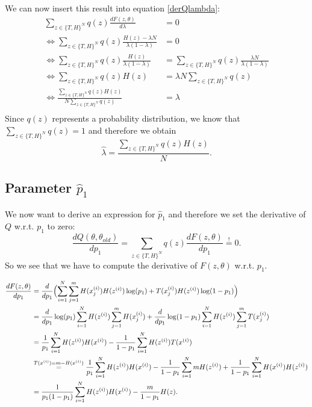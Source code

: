 \documentclass[10pt,a4paper]{article}
\begin{document}
We can now insert this result into equation \ref{derQlambda}:
\begin{align*}
\sum_{z\in \{T,H\}^N} q(z) \frac{dF(z,\theta)}{d\lambda} &=0\\
\Leftrightarrow \sum_{z\in \{T,H\}^N} q(z) \frac{H(z)-\lambda N}{\lambda(1-\lambda)} &=0\\
\Leftrightarrow \sum_{z\in \{T,H\}^N} q(z) \frac{H(z)}{\lambda(1-\lambda)} &= \sum_{z\in \{T,H\}^N} q(z) \frac{\lambda N}{\lambda(1-\lambda)}\\
\Leftrightarrow \sum_{z\in \{T,H\}^N} q(z) H(z) &= \lambda N \sum_{z\in \{T,H\}^N} q(z) \\
\Leftrightarrow \frac{\sum_{z\in \{T,H\}^N} q(z) H(z)}{N \sum_{z\in \{T,H\}^N} q(z)} &= \lambda\\
\end{align*}
Since $q(z)$ represents a probability distribution, we know that $\sum_{z\in \{T,H\}^N} q(z)=1$ and therefore we obtain
\begin{equation*}
\hat \lambda = \frac{\sum_{z\in \{T,H\}^N} q(z) H(z)}{N}.
\end{equation*}

\subsection*{Parameter $\hat p_1$}

We now want to derive an expression for $\hat p_1$ and therefore we set the derivative of $Q$ w.r.t. $p_1$ to zero:
\begin{equation}\label{derQp1}
\frac{dQ(\theta,\theta_{old})}{d p_1}=\sum_{z\in \{T,H\}^N} q(z) \frac{dF(z,\theta)}{d p_1} \stackrel{!}{=}0.
\end{equation}
So we see that we have to compute the derivative of $F(z,\theta)$ w.r.t. $p_1$.

\begin{align*}
\frac{dF(z,\theta)}{d p_1} &= \frac{d}{d p_1} \Bigl ( \sum_{i=1}^N \sum_{j=1}^m  H(x_j^{(i)}) H(z^{(i)}) \log(p_1) + T(x_j^{(i)}) H(z^{(i)})\log(1-p_1) \Bigr )\\
&= \frac{d}{d p_1} \log(p_1) \sum_{i=1}^N  H(z^{(i)})\sum_{j=1}^m  H(x_j^{(i)})  + \frac{d}{d p_1} \log(1-p_1) \sum_{i=1}^N H(z^{(i)}) \sum_{j=1}^m T(x_j^{(i)}) \\
&= \frac{1}{p_1} \sum_{i=1}^N  H(z^{(i)}) H(x^{(i)}) - \frac{1}{1-p_1} \sum_{i=1}^N H(z^{(i)}) T(x^{(i)}) \\
&\stackrel{T(x^{(i)})=m-H(x^{(i)})}{=} \frac{1}{p_1} \sum_{i=1}^N  H(z^{(i)}) H(x^{(i)}) - \frac{1}{1-p_1} \sum_{i=1}^N m H(z^{(i)}) + \frac{1}{1-p_1} \sum_{i=1}^N H(x^{(i)})H(z^{(i)}) \\
&=\frac{1}{p_1(1-p_1)} \sum_{i=1}^N  H(z^{(i)}) H(x^{(i)}) - \frac{m}{1-p_1} H(z).
\end{align*}
\end{document}
